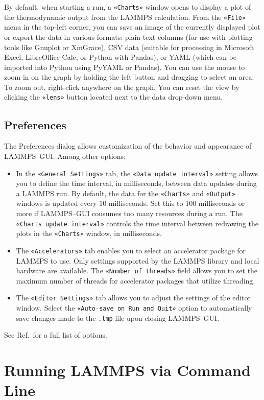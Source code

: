 \documentclass[9pt,tutorial]{livecoms}
\newcommand{\flecmd}[1]{\textcolor{command}{\texttt{#1}}} %
\newcommand{\guicmd}[1]{\textcolor{command}{\texttt{«#1»}}} %
\begin{document}
\begin{appendices}
By default, when starting a run, a \guicmd{Charts} window opens to display
a plot of the thermodynamic output from the LAMMPS calculation.  From the \guicmd{File}
menu in the top-left corner, you can save an image of the
currently displayed plot or export the data in various formats:
plain text columns (for use with plotting tools like Gnuplot or XmGrace),
CSV data (suitable for processing in Microsoft Excel, LibreOffice Calc,
or Python with Pandas), or YAML (which can be imported into Python using PyYAML or Pandas).
You can use the mouse to zoom in on the graph by holding the left button and dragging
to select an area.  To zoom out, right-click anywhere on the graph.  You can reset the view
by clicking the \guicmd{lens} button located next to the data drop-down menu.

\subsection{Preferences}

The Preferences dialog allows customization of the behavior and appearance of
LAMMPS--GUI.  Among other options:
\begin{itemize}
\item In the \guicmd{General Settings} tab, the \guicmd{Data update interval} setting
allows you to define the time interval, in milliseconds, between data updates during
a LAMMPS run.  By default, the data for the \guicmd{Charts} and \guicmd{Output}
windows is updated every 10 milliseconds.  Set this to 100 milliseconds or more
if LAMMPS--GUI consumes too many resources during a run.  The \guicmd{Charts update interval}
controls the time interval between redrawing the plots in the \guicmd{Charts} window, in milliseconds.
\item The \guicmd{Accelerators} tab enables you to select an accelerator package
for LAMMPS to use.  Only settings supported by the LAMMPS library and local hardware
are available.  The \guicmd{Number of threads} field allows you to set the maximum
number of threads for accelerator packages that utilize threading.
\item The \guicmd{Editor Settings} tab allows you to adjust the settings of the editor
window.  Select the \guicmd{Auto-save on Run and Quit} option to automatically save changes
made to the \flecmd{.lmp} file upon closing LAMMPS--GUI.
\end{itemize}
See Ref.\, for a full list of options.

\section{Running LAMMPS via Command Line}
\label{command-line-label}


\end{appendices}
\end{document}
